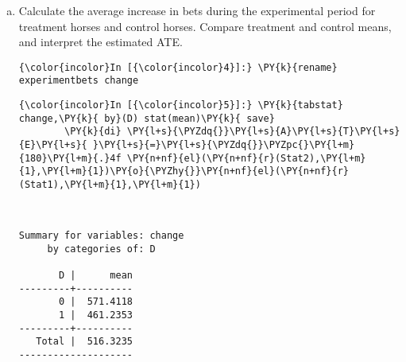 \documentclass[11pt,notitlepage]{article}\usepackage[]{graphicx}\usepackage[]{color}
\makeatletter
\newenvironment{kframe}{%
 \def\at@end@of@kframe{}%
 \ifinner\ifhmode%
  \def\at@end@of@kframe{\end{minipage}}%
  \begin{minipage}{\columnwidth}%
 \fi\fi%
 \def\FrameCommand##1{\hskip\@totalleftmargin \hskip-\fboxsep
 \colorbox{shadecolor}{##1}\hskip-\fboxsep
     \hskip-\linewidth \hskip-\@totalleftmargin \hskip\columnwidth}%
 \MakeFramed {\advance\hsize-\width
   \@totalleftmargin\z@ \linewidth\hsize
   \@setminipage}}%
 {\par\unskip\endMakeFramed%
 \at@end@of@kframe}
\newenvironment{knitrout}{}{} %
\makeatother
\begin{document}
\begin{enumerate}[a)]
\begin{knitrout}
\begin{kframe}
\begin{Verbatim}[commandchars=\\\{\}]
{\color{incolor}In [{\color{incolor}3}]:}\PY{c+c1}{//}\PY{c+c1}{ }\PY{c+c1}{p}\PY{c+c1}{.}\PY{c+c1}{v}\PY{c+c1}{a}\PY{c+c1}{l}\PY{c+c1}{u}\PY{c+c1}{e}
        \PY{k}{di} \PY{n+nf}{el}(\PY{n+nf}{r}(p),\PY{l+m}{1},\PY{l+m}{1})

.3736

    \end{Verbatim}
\end{kframe}
\end{knitrout}

We conducted 10,000 random assignments, and for each we calculated the F-statistic of a regression of treatment assignment on pre-experimental bets (controlling for blocks).  The observed F-statistic for the actual experiment is larger than 3736 of the simulated experiments, implying a p-value of .3736.

\item Calculate the average increase in bets during the experimental period for treatment horses and control horses.  Compare treatment and control means, and interpret the estimated ATE.  
\begin{knitrout}
\color{fgcolor}\begin{kframe}
    \begin{Verbatim}[commandchars=\\\{\}]
{\color{incolor}In [{\color{incolor}4}]:} \PY{k}{rename} experimentbets change
\end{Verbatim}

    \begin{Verbatim}[commandchars=\\\{\}]
{\color{incolor}In [{\color{incolor}5}]:} \PY{k}{tabstat} change,\PY{k}{ by}(D) stat(mean)\PY{k}{ save}	
        \PY{k}{di} \PY{l+s}{\PYZdq{}}\PY{l+s}{A}\PY{l+s}{T}\PY{l+s}{E}\PY{l+s}{ }\PY{l+s}{=}\PY{l+s}{\PYZdq{}}\PYZpc{}\PY{l+m}{180}\PY{l+m}{.}4f \PY{n+nf}{el}(\PY{n+nf}{r}(Stat2),\PY{l+m}{1},\PY{l+m}{1})\PY{o}{\PYZhy{}}\PY{n+nf}{el}(\PY{n+nf}{r}(Stat1),\PY{l+m}{1},\PY{l+m}{1})
\end{Verbatim}

    \begin{Verbatim}[commandchars=\\\{\}]


Summary for variables: change
     by categories of: D 

       D |      mean
---------+----------
       0 |  571.4118
       1 |  461.2353
---------+----------
   Total |  516.3235
--------------------


\end{Verbatim}
\end{kframe}
\end{knitrout}
\end{enumerate}
\end{document}
